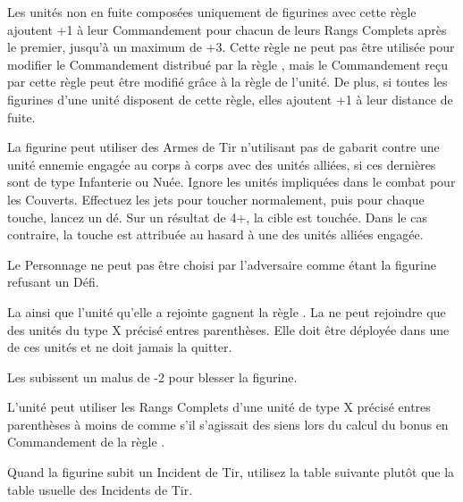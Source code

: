 

\startarmyspecialrules

\armyspecialruleentry{\safetyinnumbers}

Les unités non en fuite composées uniquement de figurines avec cette règle ajoutent +1 à leur Commandement pour chacun de leurs Rangs Complets après le premier, jusqu'à un maximum de +3. Cette règle ne peut pas être utilisée pour modifier le Commandement distribué par la règle \inspiringpresence{}, mais le Commandement reçu par cette règle peut être modifié grâce à la règle \safetyinnumbers{} de l'unité. De plus, si toutes les figurines d'une unité disposent de cette règle, elles ajoutent +1 à leur distance de fuite.


\armyspecialruleentry{\callous}

La figurine peut utiliser des Armes de Tir n'utilisant pas de gabarit contre une unité ennemie engagée au corps à corps avec des unités alliées, si ces dernières sont de type Infanterie ou Nuée. Ignore les unités impliquées dans le combat pour les Couverts. Effectuez les jets pour toucher normalement, puis pour chaque touche, lancez un dé. Sur un résultat de 4+, la cible est touchée. Dans le cas contraire, la touche est attribuée au hasard à une des unités alliées engagée.


\armyspecialruleentry{\honourless}

Le Personnage ne peut pas être choisi par l'adversaire comme étant la figurine refusant un Défi.



La \warplatform{} ainsi que l'unité qu'elle a rejointe gagnent la règle \immunetopsychology{}. La \warplatform{} ne peut rejoindre que des unités du type X précisé entres parenthèses. Elle doit être déployée dans une de ces unités et ne doit jamais la quitter.


\armyspecialruleentry{\resistant}

Les \toxicattacks{} subissent un malus de -2 pour blesser la figurine.



L'unité peut utiliser les Rangs Complets d'une unité de type X précisé entres parenthèses à moins de  comme s'il s'agissait des siens lors du calcul du bonus en Commandement de la règle \safetyinnumbers{}.

\newpage
\armyspecialruleentry{\volatile}

Quand la figurine subit un Incident de Tir, utilisez la table suivante plutôt que la table usuelle des Incidents de Tir.

